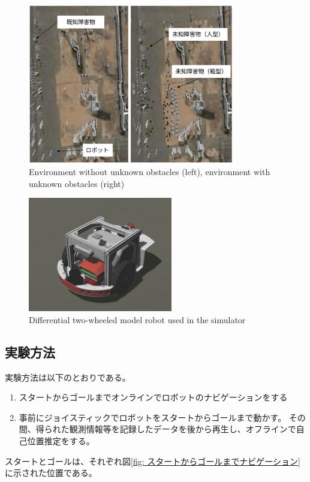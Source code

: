 \documentclass{jarticle}
\begin{document}
\begin{figure}[htbp]
  \centering
   \includegraphics[height=70mm]{fig/environment_comparison.png}
   \vspace*{-4mm}
   \caption{Environment without unknown obstacles (left), environment with unknown obstacles (right)}
   \label{fig: つくばチャレンジ人混みシミュレータ}
\end{figure}

\begin{figure}[htbp]
  \centering
   \includegraphics[height=50mm]{fig/raspicat_gazebo.png}
   \vspace*{-4mm}
   \caption{Differential two-wheeled model robot used in the simulator}
   \label{fig: raspicat}
\end{figure}

\subsection{実験方法}

実験方法は以下のとおりである。
\noindent
\begin{enumerate}[A]
  \item スタートからゴールまでオンラインでロボットのナビゲーションをする
  \item 事前にジョイスティックでロボットをスタートからゴールまで動かす。
        その間、得られた観測情報等を記録したデータを後から再生し、オフラインで自己位置推定をする。
\end{enumerate}
\noindent
スタートとゴールは、それぞれ図\ref{fig: スタートからゴールまでナビゲーション}
に示された位置である。
\end{document}
